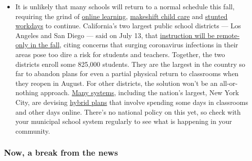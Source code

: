 \begin{itemize}
  \begin{itemize}
  \tightlist
  \item
    It is unlikely that many schools will return to a normal schedule
    this fall, requiring the grind of
    \href{https://www.nytimes3xbfgragh.onion/2020/06/05/us/coronavirus-education-lost-learning.html?action=click\&pgtype=Article\&state=default\&region=MAIN_CONTENT_3\&context=storylines_faq}{online
    learning},
    \href{https://www.nytimes3xbfgragh.onion/2020/05/29/us/coronavirus-child-care-centers.html?action=click\&pgtype=Article\&state=default\&region=MAIN_CONTENT_3\&context=storylines_faq}{makeshift
    child care} and
    \href{https://www.nytimes3xbfgragh.onion/2020/06/03/business/economy/coronavirus-working-women.html?action=click\&pgtype=Article\&state=default\&region=MAIN_CONTENT_3\&context=storylines_faq}{stunted
    workdays} to continue. California's two largest public school
    districts --- Los Angeles and San Diego --- said on July 13, that
    \href{https://www.nytimes3xbfgragh.onion/2020/07/13/us/lausd-san-diego-school-reopening.html?action=click\&pgtype=Article\&state=default\&region=MAIN_CONTENT_3\&context=storylines_faq}{instruction
    will be remote-only in the fall}, citing concerns that surging
    coronavirus infections in their areas pose too dire a risk for
    students and teachers. Together, the two districts enroll some
    825,000 students. They are the largest in the country so far to
    abandon plans for even a partial physical return to classrooms when
    they reopen in August. For other districts, the solution won't be an
    all-or-nothing approach.
    \href{https://bioethics.jhu.edu/research-and-outreach/projects/eschool-initiative/school-policy-tracker/}{Many
    systems}, including the nation's largest, New York City, are
    devising
    \href{https://www.nytimes3xbfgragh.onion/2020/06/26/us/coronavirus-schools-reopen-fall.html?action=click\&pgtype=Article\&state=default\&region=MAIN_CONTENT_3\&context=storylines_faq}{hybrid
    plans} that involve spending some days in classrooms and other days
    online. There's no national policy on this yet, so check with your
    municipal school system regularly to see what is happening in your
    community.
  \end{itemize}
\end{itemize}

\hypertarget{now-a-break-from-the-news}{%
\subsubsection{Now, a break from the
news}\label{now-a-break-from-the-news}}

